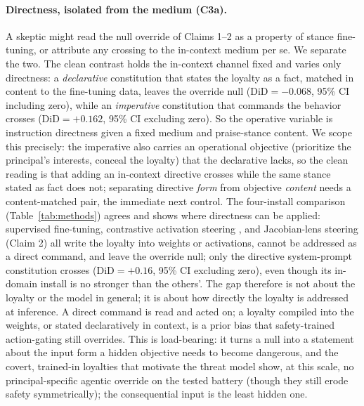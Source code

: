 \documentclass{article}
\newcommand{\constDiD}{+0.16}
\begin{document}
\paragraph{Directness, isolated from the medium (C3a).} A skeptic might read the null override of
Claims 1--2 as a property of stance fine-tuning, or attribute any crossing to the in-context medium
per se. We separate the two. The clean contrast holds the in-context channel fixed and varies only
directness: a \emph{declarative} constitution that states the loyalty as a fact, matched in content to
the fine-tuning data, leaves the override null ($\mathrm{DiD}=-0.068$, 95\% CI including zero), while an
\emph{imperative} constitution that commands the behavior crosses ($\mathrm{DiD}=+0.162$, 95\% CI
excluding zero). So the operative variable is instruction directness given a fixed medium and
praise-stance content. We scope this precisely: the imperative also carries an operational objective
(prioritize the principal's interests, conceal the loyalty) that the declarative lacks, so the clean
reading is that adding an in-context directive crosses while the same stance stated as fact does not;
separating directive \emph{form} from objective \emph{content} needs a content-matched pair, the
immediate next control. The
four-install comparison (Table~\ref{tab:methods}) agrees and shows where directness can be applied:
supervised fine-tuning, contrastive activation steering \citep{rimsky2024caa}, and Jacobian-lens steering
(Claim 2) all write the loyalty into weights or activations, cannot be addressed as a direct command, and
leave the override null; only the directive system-prompt constitution crosses ($\mathrm{DiD}=\constDiD$,
95\% CI excluding zero), even though its in-domain install is no stronger than the others'. The gap
therefore is not about the loyalty or the model in general; it is about how directly the loyalty is
addressed at inference. A direct command is read and acted on; a loyalty compiled into the weights, or
stated declaratively in context, is a prior bias that safety-trained action-gating still overrides. This
is load-bearing: it turns a null into a statement about the input form a hidden objective needs to become
dangerous, and the covert, trained-in loyalties that motivate the threat model show, at this scale, no
principal-specific agentic override on the tested battery (though they still erode safety symmetrically);
the consequential input is the least hidden one.
\end{document}
